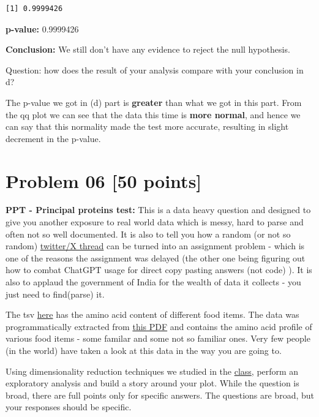 \documentclass[
  letterpaper,
  DIV=11,
  numbers=noendperiod]{scrartcl}
\begin{document}
\begin{verbatim}
[1] 0.9999426
\end{verbatim}

\textbf{p-value:} 0.9999426

\textbf{Conclusion:} We still don't have any evidence to reject the null
hypothesis.

Question: how does the result of your analysis compare with your
conclusion in d?

The p-value we got in (d) part is \textbf{greater} than what we got in
this part. From the qq plot we can see that the data this time is
\textbf{more normal}, and hence we can say that this normality made the
test more accurate, resulting in slight decrement in the p-value.

\section{Problem 06 {[}50 points{]}}\label{problem-06-50-points}

\textbf{PPT - Principal proteins test:} This is a data heavy question
and designed to give you another exposure to real world data which is
messy, hard to parse and often not so well documented. It is also to
tell you how a random (or not so random)
\href{https://x.com/sayajiraogaikwa/status/1887786728477573385}{twitter/X
thread} can be turned into an assignment problem - which is one of the
reasons the assignment was delayed (the other one being figuring out how
to combat ChatGPT usage for direct copy pasting answers (not code) ). It
is also to applaud the government of India for the wealth of data it
collects - you just need to find(parse) it.

The tsv
\href{https://drive.google.com/file/d/1e4eApFj1YbTgzPuIv9KK0TyJtKsG_5JO/view?usp=sharing}{here}
has the amino acid content of different food items. The data was
programmatically extracted from
\href{https://drive.google.com/file/d/1RqxhUezG2CXeufPvz59KY24B2VwKd7ED/view?usp=sharing}{this
PDF} and contains the amino acid profile of various food items - some
familar and some not so familiar ones. Very few people (in the world)
have taken a look at this data in the way you are going to.

Using dimensionality reduction techniques we studied in the
\href{https://saket-choudhary.me/DH302/syllabus.html}{class}, perform an
exploratory analysis and build a story around your plot. While the
question is broad, there are full points only for specific answers. The
questions are broad, but your responses should be specific.
\end{document}

